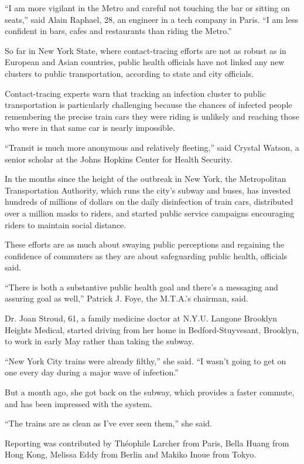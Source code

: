 ``I am more vigilant in the Metro and careful not touching the bar or
sitting on seats,'' said Alain Raphael, 28, an engineer in a tech
company in Paris. ``I am less confident in bars, cafes and restaurants
than riding the Metro.''

So far in New York State, where contact-tracing efforts are not as
robust as in European and Asian countries, public health officials have
not linked any new clusters to public transportation, according to state
and city officials.

Contact-tracing experts warn that tracking an infection cluster to
public transportation is particularly challenging because the chances of
infected people remembering the precise train cars they were riding is
unlikely and reaching those who were in that same car is nearly
impossible.

``Transit is much more anonymous and relatively fleeting,'' said Crystal
Watson, a senior scholar at the Johns Hopkins Center for Health
Security.

In the months since the height of the outbreak in New York, the
Metropolitan Transportation Authority, which runs the city's subway and
buses, has invested hundreds of millions of dollars on the daily
disinfection of train cars, distributed over a million masks to riders,
and started public service campaigns encouraging riders to maintain
social distance.

These efforts are as much about swaying public perceptions and regaining
the confidence of commuters as they are about safeguarding public
health, officials said.

``There is both a substantive public health goal and there's a messaging
and assuring goal as well,'' Patrick J. Foye, the M.T.A.'s chairman,
said.

Dr. Joan Stroud, 61, a family medicine doctor at N.Y.U. Langone Brooklyn
Heights Medical, started driving from her home in Bedford-Stuyvesant,
Brooklyn, to work in early May rather than taking the subway.

``New York City trains were already filthy,'' she said. ``I wasn't going
to get on one every day during a major wave of infection.''

But a month ago, she got back on the subway, which provides a faster
commute, and has been impressed with the system.

``The trains are as clean as I've ever seen them,'' she said.

Reporting was contributed by Théophile Larcher from Paris, Bella Huang
from Hong Kong, Melissa Eddy from Berlin and Makiko Inoue from Tokyo.

